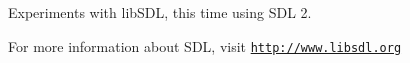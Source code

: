 Experiments with lib\+S\+D\+L, this time using S\+D\+L 2.

For more information about S\+D\+L, visit \href{http://www.libsdl.org}{\tt http\+://www.\+libsdl.\+org} 